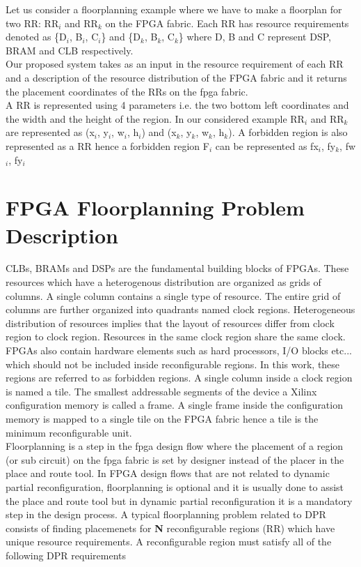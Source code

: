 \documentclass[conference]{IEEEtran}
\begin{document}
Let us consider a floorplanning example where we have to make a floorplan for two RR: RR$_i$ and RR$_k$ on the FPGA fabric. Each RR has resource requirements denoted as \{D$_i$, B$_i$, C$_i$\} and \{D$_k$, B$_k$, C$_k$\} where D, B and C represent DSP, BRAM and CLB respectively. \\ Our proposed system takes as an input in the resource requirement of each RR and a description of the resource distribution of the FPGA fabric and it returns the placement coordinates of the RRs on the fpga fabric. \\
A RR is represented using 4 parameters i.e. the two bottom left coordinates and the width and the height of the region. In our considered example RR$_i$ and RR$_k$ are represented as (x$_i$, y$_i$, w$_i$, h$_i$) and (x$_k$, y$_k$, w$_k$, h$_k$). A forbidden region is also represented as a RR hence a forbidden region F$_i$ can be represented as {fx$_i$, fy$_k$, fw$_i$, fy$_i$}  \\ 

\section{FPGA Floorplanning Problem Description}
CLBs, BRAMs and DSPs are the fundamental building blocks of FPGAs. These resources which have a heterogenous distribution are organized as grids of columns. A single column contains a single type of resource. The entire grid of columns are further organized into quadrants named clock regions. Heterogeneous distribution of resources implies that the layout of resources differ from clock region to clock region. Resources in the same clock region share the same clock. FPGAs also contain hardware elements such as hard processors, I/O blocks etc... which should not be included inside reconfigurable regions. In this work, these regions are referred to as forbidden regions. A single column inside a clock region is named a tile. The smallest addressable segments of the device a Xilinx configuration memory is called a frame. A single frame inside the configuration memory is mapped to a single tile on the FPGA fabric hence a tile is the minimum reconfigurable unit. \\

Floorplanning is a step in the fpga design flow where the placement of a region (or sub circuit) on the fpga fabric is set by designer instead of the placer in the place and route tool. In FPGA design flows that are not related to dynamic partial reconfiguration, floorplanning is optional and it is usually done to assist the place and route tool but in dynamic partial reconfiguration it is a mandatory step in the design process. A typical floorplanning problem related to DPR consists of finding placemenets for \textbf{N} reconfigurable regions (RR) which have unique resource requirements. A reconfigurable region must satisfy all of the following DPR requirements
\end{document}
